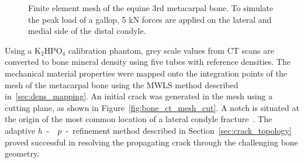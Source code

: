 \documentclass[onecolumn]{svjour3}
\begin{document}
% 
% 
\begin{figure}[h]
	\begin{center}
		\caption{Finite element mesh of the equine 3rd metacarpal bone. To simulate the peak load of a gallop, 5 kN forces are applied on the lateral and medial side of the distal condyle.}
		\label{fig:mc3_BC}
	\end{center}
\end{figure}
% 
% 
Using a $\mathrm {K_2 HPO_4}$ calibration phantom, grey scale values from CT scans are converted to bone mineral density 
using five tubes with reference densities. 
The mechanical material properties were mapped onto the integration points of the mesh of the metacarpal bone using the MWLS method described in~\ref{sec:dens_mapping}. 
% 
An initial crack was generated in the mesh using a cutting plane, as shown in Figure~\ref{fig:bone_ct_mesh_cut}. A notch is situated at the origin of the most common location of a lateral condyle fracture~\cite{jacklin2012frequency}. The adaptive $h$~-~~$p$~-~refinement method described in Section~\ref{sec:crack_topology} proved successful in resolving the propagating crack through the challenging bone geometry.
\end{document}
